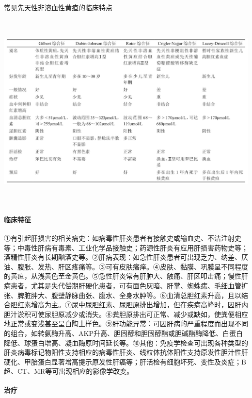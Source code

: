 \begin{table}[htbp]
\centering
\caption{常见先天性非溶血性黄疸的临床特点}
\label{tab16-1}
\includegraphics[width=6.61458in,height=3.94792in]{./images/Image00063.jpg}
\end{table}

\paragraph{临床特征}

①有引起肝损害的相关病史：如病毒性肝炎患者有接触史或输血史、不洁注射史等；中毒性肝病有毒素、工业化学品接触史；药源性肝炎有应用肝损害药物史等；酒精性肝炎有长期酗酒史等。②肝病表现：如急性肝炎患者可出现乏力、纳差、厌油、腹胀、发热、肝区疼痛等。③可有皮肤瘙痒。④皮肤、黏膜、巩膜呈不同程度的黄疸，从浅黄色至金黄色。⑤急性肝炎常有肝肿大、触痛、肝区叩击痛；慢性肝病患者，尤其是失代偿期肝硬化患者，可有面色灰暗、肝掌、蜘蛛痣、毛细血管扩张、脾脏肿大、腹壁静脉曲张、腹水、全身水肿等。⑥血清总胆红素升高，且以结合胆红素增高为主。⑦尿中尿胆红素、尿胆原排出增加，但在疾病高峰时，因肝内胆汁淤积可使尿胆原减少或消失。⑧粪胆原排出可正常、减少或缺如，使粪便相应地正常或变浅甚至呈白陶土样色。⑨肝功能异常：可因肝病的严重程度而出现不同的组合，如转氨酶升高、AKP升高、胆固醇和胆固醇酯或胆碱酯酶降低、白蛋白降低、球蛋白增高、凝血酶原时间延长等。⑩其他：免疫学检查可出现各种类型的肝炎病毒标记物阳性支持相应的病毒性肝炎、线粒体抗体阳性支持原发性胆汁性肝硬化、甲胎蛋白显著增高提示原发性肝癌等；肝活检有细胞坏死、变性及炎症；B超、CT、MR等可出现相应的影像学改变。

\paragraph{治疗}

